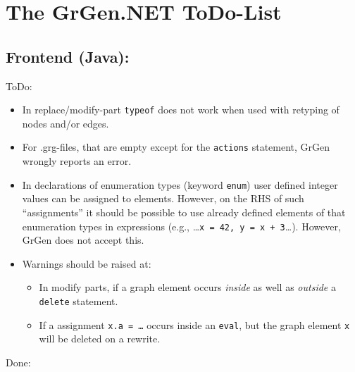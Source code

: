 \documentclass[12pt,a4paper]{article}
\begin{document}
\section*{\LARGE The GrGen.NET ToDo-List}



\subsection*{Frontend (Java):}
ToDo:
\begin{itemize}
	\item In replace/modify-part {\tt typeof} does not work when used with retyping of nodes and/or edges.
	\item For .grg-files, that are empty except for the {\tt actions} statement, GrGen wrongly reports an error.
	\item In declarations of enumeration types (keyword {\tt enum}) user defined integer values can be assigned to elements.
	  However, on the RHS of such "`assignments"' it should be possible to use already defined elements of that enumeration types in expressions (e.g., \dots{}{\tt{}x = 42, y = x + 3}\dots). However, GrGen does not accept this.
	\item Warnings should be raised at:
		\begin{itemize}
			\item In modify parts, if a graph element occurs \emph{inside} as well as \emph{outside} a {\tt delete} statement.
			\item If a assignment {\tt x.a = \dots} occurs inside an {\tt eval}, but the graph element {\tt x} will be deleted on a rewrite.
		\end{itemize}
\end{itemize}
Done:
\end{document}
